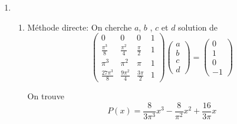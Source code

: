 \documentclass[a4paper]{article}
\begin{document}
\begin{enumerate}
\begin{enumerate}
\end{enumerate}
\item 
\begin{enumerate}
\item Méthode directe: On cherche $a$, $b$ , $c$ et $d$ solution de
\[\left(\begin{array}{cccc}
0&0&0&1\\
\frac{\pi^3}{8}&\frac{\pi^2}{4}&\frac{\pi}{2}&1\\
\pi^3&\pi^2&\pi&1\\
\frac{27\pi^3}{8}&\frac{9\pi^2}{4}&\frac{3\pi}{2}&1
\end{array}\right)\left(\begin{array}{c} a\\b\\c\\d \end{array}\right)=\left(\begin{array}{c} 0\\1\\0\\-1 \end{array}\right)\]

On trouve \[P(x)=\frac{8}{3\pi^3}x^3-\frac{8}{\pi^2}x^2+\frac{16}{3\pi}x\]
                       



\end{enumerate}
\end{enumerate}
\end{document}
